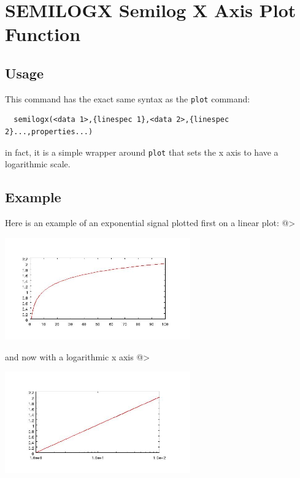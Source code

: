 \section{SEMILOGX Semilog X Axis Plot Function}

\subsection{Usage}

This command has the exact same syntax as the \verb|plot| command:
\begin{verbatim}
  semilogx(<data 1>,{linespec 1},<data 2>,{linespec 2}...,properties...)
\end{verbatim}
in fact, it is a simple wrapper around \verb|plot| that sets the
x axis to have a logarithmic scale.
\subsection{Example}

Here is an example of an exponential signal plotted first on a linear
plot:
@>


\centerline{\includegraphics[width=8cm]{semilogx1}}

and now with a logarithmic x axis
@>


\centerline{\includegraphics[width=8cm]{semilogx2}}

